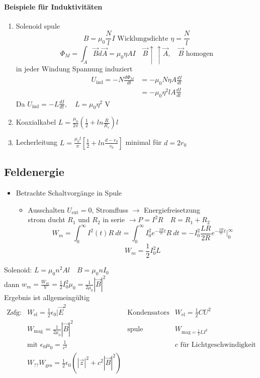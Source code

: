 \documentclass[titlepage,12pt,a4paper,ngerman]{report}
\newcommand{\tx}[1]{\textrm{#1}}
\newcommand{\uind}{U_{\tx{ind}}}
\begin{document}
\paragraph{Beispiele für Induktivitäten}
\begin{enumerate}
	\item Solenoid spule 
	$$B = \mu_0 \frac{N}{l} I \tx{ Wicklungsdichte } \eta = \frac{N}{l}$$
	$$\Phi_M = \int_A \vec{B} d\vec{A} = \mu_0 \eta A I \quad \vec{B}\uparrow \uparrow \vec{A}, \quad \vec{B} \tx{ homogen}$$
	in jeder Windung Spannung induziert
	\begin{align*}
	\uind = - N \frac{d \Phi_M}{dt} &= - \mu_0 N \eta A \frac{dI}{dt}\\
	&=- \mu_0 \eta^2 l A \frac{dI}{dt}
	\end{align*}
	Da $\uind = -L \frac{dI}{dt}, \quad L = \mu_0 \eta^2 \tx{ V}$ 
	\item Koaxialkabel $L = \frac{\mu_0}{2 \pi} ( \frac{1}{2} + ln \frac{R}{R_s}) l$
	\item Lecherleitung $L = \frac{\mu_0 l}{\pi} [\frac{1}{2} + ln \frac{d - r_0}{r_0}]$ minimal für $d= 2r_0$  
\end{enumerate}
\subsection{Feldenergie}
\begin{itemize}
	\item Betrachte Schaltvorgänge in Spule 
	\begin{itemize}
		Einschalten $\rightarrow$ Aufbau $\vec{B}$-Feld Energie im $\vec{B}$-Feld gespeichert
		\item Ausschalten $U_{\tx{ext}} = 0$, Stromfluss $\rightarrow$ Energiefreisetzung\\
		strom ducht $R_1$ und $R_2$ in serie $\rightarrow P = I^2 R \quad R = R_1 + R_2$
		$$W_m = \int_0^\infty I^2 (t) R\ dt = \int_0^\infty I_0^2 e^{-\frac{2R}{L} t} R\ dt = - I_0^2 \frac{LR}{2R}e^{-\frac{2R}{L} t} \bigg|_0^\infty$$
		$$\boxed{W_m = \frac{1}{2}I_0^2 L}$$
	\end{itemize}
\end{itemize}
Solenoid: $L = \mu_0 n^2 Al \quad B = \mu_0 n I_0$\\
dann $w_m = \frac{W_m}{V} = \frac{1}{2} I_0^2 \mu_0 =\frac{1}{2\mu_0}| \vec{B}|^2$\\
Ergebnis ist allgemeingültig
$$\begin{array}{llll}
\tx{Zsfg}: & W_{\tx{el}} = \frac{1}{2} \epsilon_0 |\vec{E}^2 & \tx{Kondensators} & W_{\tx{el}} = \frac{1}{2}CU^2 \\
& W_{\tx{mag}} = \frac{1}{2 \mu_0} |\vec{B}|^2 & \tx{spule} & W_{\tx{mag} = \frac{1}{2}LI^2}\\
& \tx{mit } \epsilon_0 \mu_0 = \frac{1}{c^2} && c\tx{ für Lichtgeschwindigkeit} \\
& W_{\tx{??}} W_{\tx{ges}} = \frac{1}{2} \epsilon_0 (|\vec{z}|^2 + c^2 |\vec{B}|^2)
\end{array}$$
\end{document}
